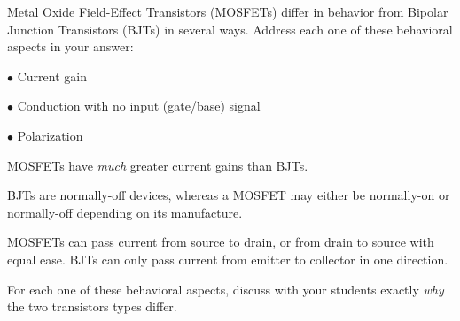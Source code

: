 

Metal Oxide Field-Effect Transistors (MOSFETs) differ in behavior from Bipolar Junction Transistors (BJTs) in several ways.  Address each one of these behavioral aspects in your answer:

\medskip
\goodbreak
\item{$\bullet$} Current gain
\item{$\bullet$} Conduction with no input (gate/base) signal
\item{$\bullet$} Polarization
\medskip







MOSFETs have {\it much} greater current gains than BJTs.

\vskip 10pt

BJTs are normally-off devices, whereas a MOSFET may either be normally-on or normally-off depending on its manufacture.

\vskip 10pt

MOSFETs can pass current from source to drain, or from drain to source with equal ease.  BJTs can only pass current from emitter to collector in one direction.







For each one of these behavioral aspects, discuss with your students exactly {\it why} the two transistors types differ.




